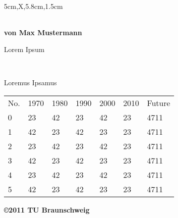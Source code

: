 \documentclass[a3paper,style=scifi,table]{tubsposter}
\begin{document}
  \begin{tubsposter}{5cm,X,5.8cm,1.5cm}
  \begin{posterrow}[bgcolor=tuLightGray]
    \bfseries{}\\[1em]
    von Max Mustermann
  \end{posterrow}
  \begin{posterrow}[X,X]
    \begin{postercol}
      {Lorem Ipsum}\\[2ex]
      \lipsum[1-2]
    \end{postercol}
    \begin{postercol}[X,X]
      \begin{postersubrow}[bgimage=infozentrum,imagefit=autoclip]
        ~
      \end{postersubrow}
      \begin{postersubrow}[bgcolor=tuOrange]
        \centering\itshape
        \lipsum[4]\par
        \raggedleft\upshape
        Loremus Ipsamus
      \end{postersubrow}
    \end{postercol}
  \end{posterrow}
  \begin{modrow*}
    \large
     
    \begin{tabularx}{\textwidth}{lXXXXXX}
      \rowcolor{tuGray20}
      No. & 1970 & 1980 & 1990 & 2000 & 2010 & Future \\
      0   & 23   & 42   & 23   & 42   & 23   & 4711 \\
      1   & 42   & 23   & 42   & 23   & 23   & 4711 \\
      2   & 23   & 42   & 23   & 42   & 23   & 4711 \\
      3   & 42   & 23   & 42   & 23   & 23   & 4711 \\
      4   & 23   & 42   & 23   & 42   & 23   & 4711 \\
      5   & 42   & 23   & 42   & 23   & 23   & 4711 \\
    \end{tabularx}
  \end{modrow*}
  \begin{modrow}[bgcolor=tuGreen]
    \bfseries\raggedleft\textcolor{tuWhite}{\copyright 2011 TU Braunschweig}
  \end{modrow}
\end{tubsposter}
\end{document}
